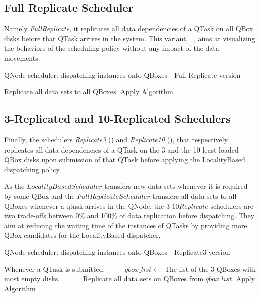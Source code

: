 \subsection{Full Replicate Scheduler}
\label{subsec:fullReplicate}

Namely \emph{FullReplicate}, it replicates all data dependencies of a QTask on all QBox disks before that QTask arrives in the system.
This variant, ~, aims at visualizing the behaviors of the scheduling policy without any impact of the data movements.

\begin{algorithm} %
    \caption{QNode scheduler: dispatching instances onto QBoxes - Full Replicate version}
    \label{alg:FullReplicateSched}
        \begin{algorithmic}[3]
            \STATE Replicate all data sets to all QBoxes.
            \STATE Apply Algorithm 
        \end{algorithmic}
\end{algorithm}

\subsection{3-Replicated and 10-Replicated Schedulers}
\label{subsec:3-10Replicate}

Finally, the schedulers \emph{Replicate3} () and \emph{Replicate10} (), that respectively replicates all data dependencies of a QTask on the 3 and the 10 least loaded QBox disks upon submission of that QTask before applying the LocalityBased dispatching policy.

As the $Locality Based Scheduler$ transfers new data sets whenever it is required by some QBox and the $Full Replicate Scheduler$ transfers all data sets to all QBoxes whenever a qtask arrives in the QNode, the $3$-$10Replicate$ schedulers are two trade-offs between 0\% and 100\% of data replication before dispatching.
They aim at reducing the waiting time of the instances of QTasks by providing more QBox candidates for the LocalityBased dispatcher.


\begin{algorithm} %
    \caption{QNode scheduler: dispatching instances onto QBoxes - Replicate3 version}
    \label{alg:3ReplicateSched}
        \begin{algorithmic}[3]
        \STATE Whenever a QTask is submitted:
        \STATE ~~~~~$qbox\_list \leftarrow$ The list of the 3 QBoxes with most empty disks.
        \STATE ~~~~~~Replicate all data sets on QBoxes from $qbox\_list$.
        \STATE Apply Algorithm 
        \end{algorithmic}
\end{algorithm}

